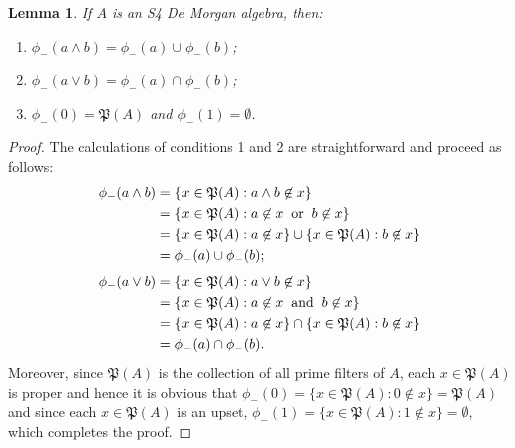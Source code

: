 \documentclass{amsart}
\theoremstyle{plain}
\newtheorem{lemma}[theorem]{Lemma}
\theoremstyle{definition}
\begin{document}
\begin{lemma}
    If $A$ is an S4 De Morgan algebra, then: 
    \begin{enumerate}
        \item $\phi_-(a\wedge b)=\phi_-(a)\cup\phi_-(b)$; 
        \item $\phi_-(a\vee b)=\phi_-(a)\cap\phi_-(b)$; 
        \item $\phi_-(0)=\mathfrak{P}(A)$ and $\phi_-(1)=\emptyset$. 
    \end{enumerate}
    \end{lemma}
    \begin{proof}
        The calculations of conditions 1 and 2 are straightforward and proceed as follows: 
        \begin{align*}
            \phi_-(a\wedge b)&=\{x\in\mathfrak{P}(A):a\wedge b\not\in x\}
            \\&=\{x\in\mathfrak{P}(A):a\not\in x\hspace{.2cm}\text{or}\hspace{.2cm}b\not\in x\}
            \\&=\{x\in\mathfrak{P}(A):a\not\in x\}\cup\{x\in\mathfrak{P}(A):b\not\in x\}
            \\&=\phi_-(a)\cup\phi_-(b);
        \end{align*}
\begin{align*}
    \phi_-(a\vee b)&=\{x\in\mathfrak{P}(A):a\vee b\not\in x\}
\\&=\{x\in\mathfrak{P}(A):a\not\in x\hspace{.2cm}\text{and}\hspace{.2cm}b\not\in x\}
 \\&=\{x\in\mathfrak{P}(A):a\not\in x\}\cap\{x\in\mathfrak{P}(A):b\not\in x\}
 \\&=\phi_-(a)\cap\phi_-(b).
\end{align*}  
Moreover, since $\mathfrak{P}(A)$ is the collection of all prime filters of $A$, each $x\in\mathfrak{P}(A)$ is proper and hence it is obvious that $\phi_-(0)=\{x\in\mathfrak{P}(A):0\not\in x\}=\mathfrak{P}(A)$ and since each $x\in\mathfrak{P}(A)$ is an upset, $\phi_-(1)=\{x\in\mathfrak{P}(A):1\not\in x\}=\emptyset$, which completes the proof. 
    \end{proof}
\end{document}
